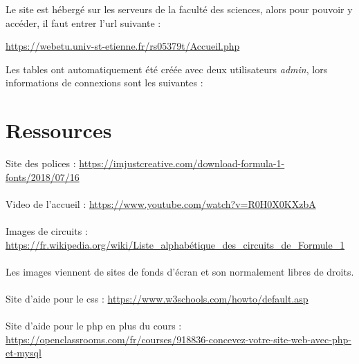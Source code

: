\documentclass{article}
\begin{document}
Le site est hébergé sur les serveurs de la faculté des sciences, alors pour pouvoir y accéder, il faut entrer l'url suivante :
\begin{center}
\url{https://webetu.univ-st-etienne.fr/rs05379t/Accueil.php}
\end{center}
\vspace{1cm}
Les tables ont automatiquement été créée avec deux utilisateurs \emph{admin}, lors informations de connexions sont les suivantes :
\vspace{5mm}
\begin{center}
\hspace{1cm}
\end{center}



\newpage
\section{Ressources}

Site des polices : \url{https://imjustcreative.com/download-formula-1-fonts/2018/07/16}\\\\
Video de l'accueil : \url{https://www.youtube.com/watch?v=R0H0X0KXzbA}\\\\
Images de circuits : \url{https://fr.wikipedia.org/wiki/Liste_alphabétique_des_circuits_de_Formule_1}\\\\
Les images viennent de sites de fonds d'écran et son normalement libres de droits.\\\\
Site d'aide pour le css : \url{https://www.w3schools.com/howto/default.asp}\\\\
Site d'aide pour le php en plus du cours :\\
\url{https://openclassrooms.com/fr/courses/918836-concevez-votre-site-web-avec-php-et-mysql}\\\\
\end{document}
